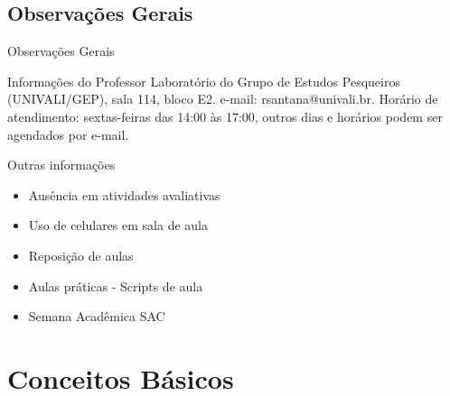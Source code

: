 \documentclass{bredelebeamer}
\begin{document}
\subsection{Observações Gerais}

\begin{frame}{Observações Gerais}

\begin{exampleblock}{Informações do Professor}
Laboratório do Grupo de Estudos Pesqueiros (UNIVALI/GEP), sala 114, 
bloco E2. e-mail: rsantana@univali.br.
Horário de atendimento: sextas-feiras das 14:00 às 17:00, outros dias e
horários podem ser agendados por e-mail.
\end{exampleblock}

\begin{block}{Outras informações}
\begin{itemize}
\item Ausência em atividades avaliativas
\item Uso de celulares em sala de aula
\item Reposição de aulas
\item Aulas práticas - Scripts de aula
\item Semana Acadêmica SAC
\end{itemize}
\end{block}

\end{frame}

\section{Conceitos Básicos}
\end{document}

